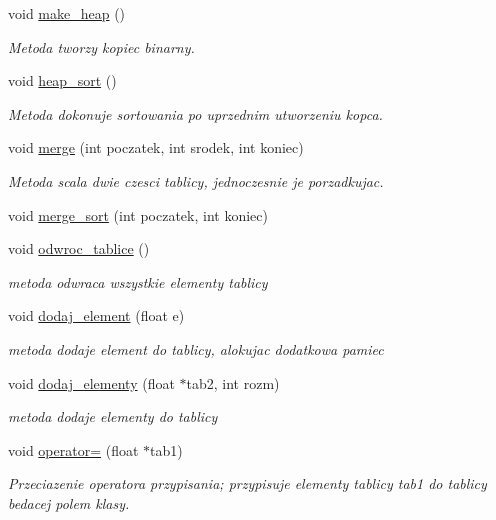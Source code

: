 \begin{DoxyCompactItemize}
void \hyperlink{classoperacje_ae752685beea6c7ee81d2347a98d40146}{make\-\_\-heap} ()
\begin{DoxyCompactList}\small\item\em Metoda tworzy kopiec binarny. \end{DoxyCompactList}\item 
void \hyperlink{classoperacje_aec9d2248eb072f97da794ee4c9b99a5d}{heap\-\_\-sort} ()
\begin{DoxyCompactList}\small\item\em Metoda dokonuje sortowania po uprzednim utworzeniu kopca. \end{DoxyCompactList}\item 
void \hyperlink{classoperacje_ad766f1d18595ff6b779485528c65d3f0}{merge} (int poczatek, int srodek, int koniec)
\begin{DoxyCompactList}\small\item\em Metoda scala dwie czesci tablicy, jednoczesnie je porzadkujac. \end{DoxyCompactList}\item 
void \hyperlink{classoperacje_ac65f2613b7d32b4f95e59bf2f8fd1aab}{merge\-\_\-sort} (int poczatek, int koniec)
\item 
void \hyperlink{classoperacje_aedc47c87f4f44f8af0cba64a940a5333}{odwroc\-\_\-tablice} ()
\begin{DoxyCompactList}\small\item\em metoda odwraca wszystkie elementy tablicy \end{DoxyCompactList}\item 
void \hyperlink{classoperacje_ad8397efded792c1381bfd0292b3e91b6}{dodaj\-\_\-element} (float e)
\begin{DoxyCompactList}\small\item\em metoda dodaje element do tablicy, alokujac dodatkowa pamiec \end{DoxyCompactList}\item 
void \hyperlink{classoperacje_a933533caa39434db543aca704804625c}{dodaj\-\_\-elementy} (float $\ast$tab2, int rozm)
\begin{DoxyCompactList}\small\item\em metoda dodaje elementy do tablicy \end{DoxyCompactList}\item 
void \hyperlink{classoperacje_a33127b613894949faba7a04f23075bf8}{operator=} (float $\ast$tab1)
\begin{DoxyCompactList}\small\item\em Przeciazenie operatora przypisania; przypisuje elementy tablicy {\ttfamily tab1} {\ttfamily do} tablicy bedacej polem klasy. \end{DoxyCompactList}\item 

\end{DoxyCompactItemize}
